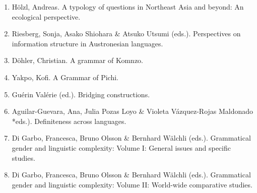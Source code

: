 \begin{multicols}{2}
\begin{enumerate}
\item Hölzl, Andreas. A typology of questions in Northeast Asia and beyond: An ecological perspective.
\item Riesberg, Sonja,  Asako Shiohara \& Atsuko Utsumi (eds.). Perspectives on information structure in Austronesian languages.
\item Döhler, Christian. A grammar of Komnzo.
\item Yakpo, Kofi. A Grammar of Pichi.
\item Guérin Valérie (ed.). Bridging constructions.
\item Aguilar-Guevara, Ana,   Julia Pozas Loyo \&  Violeta Vázquez-Rojas Maldonado *eds.). Definiteness across languages.
\item Di Garbo, Francesca, Bruno Olsson \& Bernhard Wälchli (eds.). Grammatical gender and linguistic complexity: Volume I: General issues and specific studies.
\item Di Garbo, Francesca, Bruno Olsson \& Bernhard Wälchli (eds.). Grammatical gender and linguistic complexity: Volume II: World-wide comparative studies.
\end{enumerate}
\end{multicols}
 
 
